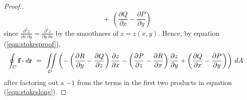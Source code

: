 \begin{proofbar}
\begin{proof}[Proof:]
\begin{equation}
   ~+~ \left( \frac{\partial Q}{\partial x} - \frac{\partial P}{\partial y} \right)
 \end{equation}
 since $\frac{\partial^2 z}{\partial x \, \partial y} = \frac{\partial^2 z}{\partial y \, \partial x}$ by the
 smoothness of $z=z(x,y)$. Hence, by equation (\ref{eqn:stokesproof}),
 \begin{equation}\label{eqn:stokespart1}
  \oint_{C} \textbf{f} \bm{\cdot} d\textbf{r} ~=~ \iint\limits_{D} \left(
   -\left( \frac{\partial R}{\partial y} - \frac{\partial Q}{\partial z} \right) \frac{\partial z}{\partial x}
   -\left( \frac{\partial P}{\partial z} - \frac{\partial R}{\partial x} \right) \frac{\partial z}{\partial y}
   + \left( \frac{\partial Q}{\partial x} - \frac{\partial P}{\partial y} \right) \right)\,dA
 \end{equation}
 after factoring out a $-1$ from the terms in the first two products in equation (\ref{eqn:stokeslong}).
 

\end{proof}
\end{proofbar}
